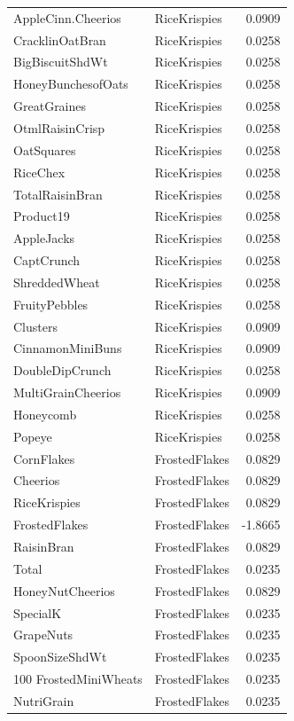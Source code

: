 \begin{longtable}{llr}
AppleCinn.Cheerios & RiceKrispies & 0.0909 \\
CracklinOatBran & RiceKrispies & 0.0258 \\
BigBiscuitShdWt & RiceKrispies & 0.0258 \\
HoneyBunchesofOats & RiceKrispies & 0.0258 \\
GreatGraines & RiceKrispies & 0.0258 \\
OtmlRaisinCrisp & RiceKrispies & 0.0258 \\
OatSquares & RiceKrispies & 0.0258 \\
RiceChex & RiceKrispies & 0.0258 \\
TotalRaisinBran & RiceKrispies & 0.0258 \\
Product19 & RiceKrispies & 0.0258 \\
AppleJacks & RiceKrispies & 0.0258 \\
CaptCrunch & RiceKrispies & 0.0258 \\
ShreddedWheat & RiceKrispies & 0.0258 \\
FruityPebbles & RiceKrispies & 0.0258 \\
Clusters & RiceKrispies & 0.0909 \\
CinnamonMiniBuns & RiceKrispies & 0.0909 \\
DoubleDipCrunch & RiceKrispies & 0.0258 \\
MultiGrainCheerios & RiceKrispies & 0.0909 \\
Honeycomb & RiceKrispies & 0.0258 \\
Popeye & RiceKrispies & 0.0258 \\
CornFlakes & FrostedFlakes & 0.0829 \\
Cheerios & FrostedFlakes & 0.0829 \\
RiceKrispies & FrostedFlakes & 0.0829 \\
FrostedFlakes & FrostedFlakes & -1.8665 \\
RaisinBran & FrostedFlakes & 0.0829 \\
Total & FrostedFlakes & 0.0235 \\
HoneyNutCheerios & FrostedFlakes & 0.0829 \\
SpecialK & FrostedFlakes & 0.0235 \\
GrapeNuts & FrostedFlakes & 0.0235 \\
SpoonSizeShdWt & FrostedFlakes & 0.0235 \\
100%
FrostedMiniWheats & FrostedFlakes & 0.0235 \\
NutriGrain & FrostedFlakes & 0.0235 \\

\end{longtable}
